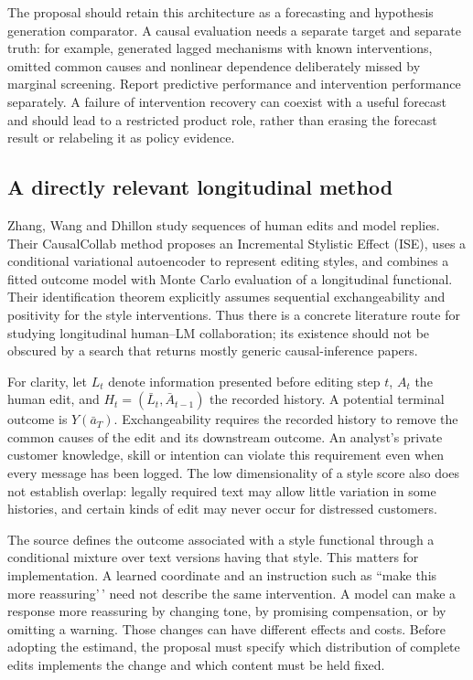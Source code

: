The proposal should retain this architecture as a forecasting and
hypothesis generation comparator. A causal evaluation needs a separate
target and separate truth: for example, generated lagged mechanisms with
known interventions, omitted common causes and nonlinear dependence
deliberately missed by marginal screening. Report predictive performance
and intervention performance separately. A failure of intervention
recovery can coexist with a useful forecast and should lead to a
restricted product role, rather than erasing the forecast result or
relabeling it as policy evidence.

\hypertarget{a-directly-relevant-longitudinal-method}{%
\subsection{A directly relevant longitudinal
method}\label{a-directly-relevant-longitudinal-method}}

Zhang, Wang and Dhillon study sequences of human edits and model
replies. Their CausalCollab method proposes an Incremental Stylistic
Effect (ISE), uses a conditional variational autoencoder to represent
editing styles, and combines a fitted outcome model with Monte Carlo
evaluation of a longitudinal functional. Their identification theorem
explicitly assumes sequential exchangeability and positivity for the
style interventions. Thus there is a concrete literature route for
studying longitudinal human--LM collaboration; its existence should not
be obscured by a search that returns mostly generic causal-inference
papers. \cite{exec13_census_collaboration}

For clarity, let \(L_t\) denote information presented before editing
step \(t\), \(A_t\) the human edit, and \(H_t=(\bar L_t,\bar A_{t-1})\)
the recorded history. A potential terminal outcome is \(Y(\bar a_T)\).
Exchangeability requires the recorded history to remove the common
causes of the edit and its downstream outcome. An analyst's private
customer knowledge, skill or intention can violate this requirement even
when every message has been logged. The low dimensionality of a style
score also does not establish overlap: legally required text may allow
little variation in some histories, and certain kinds of edit may never
occur for distressed customers.

The source defines the outcome associated with a style functional
through a conditional mixture over text versions having that style. This
matters for implementation. A learned coordinate and an instruction such
as ``make this more reassuring'\,' need not describe the same
intervention. A model can make a response more reassuring by changing
tone, by promising compensation, or by omitting a warning. Those changes
can have different effects and costs. Before adopting the estimand, the
proposal must specify which distribution of complete edits implements
the change and which content must be held fixed.

